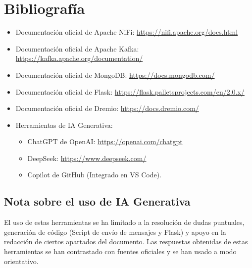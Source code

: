 \documentclass{../../../miPlantilla}
\begin{document}
\section{Bibliografía}
\begin{itemize}
  \item Documentación oficial de Apache NiFi: \url{https://nifi.apache.org/docs.html}
  \item Documentación oficial de Apache Kafka: \url{https://kafka.apache.org/documentation/}
  \item Documentación oficial de MongoDB: \url{https://docs.mongodb.com/}
  \item Documentación oficial de Flask: \url{https://flask.palletsprojects.com/en/2.0.x/}
  \item Documentación oficial de Dremio: \url{https://docs.dremio.com/}
  \item Herramientas de IA Generativa:
  \begin{itemize}
    \item ChatGPT de OpenAI: \url{https://openai.com/chatgpt}
    \item DeepSeek: \url{https://www.deepseek.com/}
    \item Copilot de GitHub (Integrado en VS Code).
  \end{itemize}
\end{itemize}

\subsection*{Nota sobre el uso de IA Generativa}
El uso de estas herramientas se ha limitado a la resolución de dudas puntuales, generación de código (Script de envío de mensajes y Flask) y
apoyo en la redacción de ciertos apartados del documento. Las respuestas obtenidas de estas herramientas se han contrastado con fuentes oficiales
y se han usado a modo orientativo.
\end{document}
